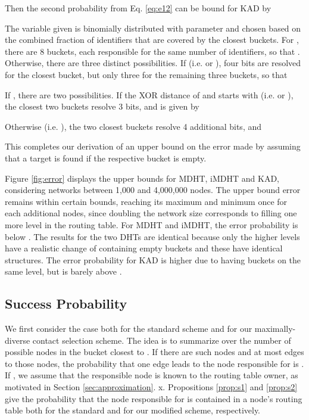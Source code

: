 \documentclass[10pt, conference, compsocconf, letterpaper]{IEEEtran}
\begin{document}
Then the second probability from Eq. \ref{eq:e12} can be bound for KAD by

The variable  given  is binomially distributed with parameter  and  chosen based on the combined fraction of identifiers that are covered by the closest  buckets.
For , there are 8 buckets, each responsible for the same number of identifiers, so that 
. 
Otherwise, there are three distinct possibilities. If  (i.e.  or ), four bits are resolved for the closest bucket, but only
three for the remaining three buckets, so that
 
If , there are two possibilities. If the XOR distance of  and  starts with  (i.e.  or ), the closest two buckets resolve 3 bits, and  is given by
 
Otherwise (i.e. ), the two closest buckets resolve 4 additional bits, and
 
This completes our derivation of an upper bound on the error made by assuming that a target is found if the respective bucket is empty. 

Figure \ref{fig:error} displays the upper bounds for MDHT, iMDHT and KAD, considering networks between 1,000 and 4,000,000 nodes. 
The upper bound error remains within certain bounds, reaching its maximum and minimum once for each  additional nodes, since doubling the network size corresponds to filling one more level in the routing table.
For MDHT and iMDHT, the error probability is below . The results for the two DHTs are identical because only the higher levels have a realistic change of containing empty buckets and these have identical structures.  
The error probability for KAD is higher due to having buckets on the same level, but is barely above .
 

\subsection{Success Probability}
\label{sec:modelsuccess}
We first consider the case  both for the standard scheme and for our maximally-diverse contact selection scheme. 
The idea is to summarize over the number of possible nodes in the bucket closest to .
If there are  such nodes and at most  edges to those nodes, the probability that 
one edge leads to the node responsible for  is .
If , we assume that the responsible node is known to the routing table owner,
as motivated in Section \ref{sec:approximation}.
x.
Propositions \ref{prop:s1} and \ref{prop:s2} give the probability that the node responsible for 
is contained in a node's routing table both for the standard and for our modified scheme, respectively.
\end{document}

